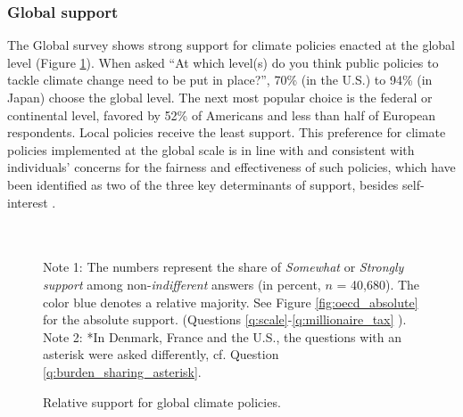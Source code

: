 \subsubsection{Global support}\label{subsubsec:global_support}

The Global survey shows strong support for climate policies enacted at the global level (Figure \ref{fig:oecd}). %
When asked ``At which level(s) do you think public policies to tackle climate change need to be put in place?'', 70\% (in the U.S.) to 94\% (in Japan) choose the global level. The next most popular choice is the federal or continental level, favored by 52\% of Americans and less than half of European respondents. Local policies receive the least support. This preference for climate policies implemented at the global scale is in line with \citet{beiser-mcgrath_could_2019} and consistent with individuals' concerns for the fairness and effectiveness of such policies, which have been identified as two of the three key determinants of support, besides self-interest \citep{klenert_making_2018,douenne_yellow_2022,dechezlepretre_fighting_2022}.
\begin{figure}[h!]
  \caption[Relative support for global climate policies]{Relative support for global climate policies.} 
  \label{fig:oecd} %
  {\footnotesize \\ $\quad$ \\ Note 1: The numbers represent the share of \textit{Somewhat} or \textit{Strongly support} among non-\textit{indifferent} answers (in percent, $n$ = 40,680). The color blue denotes a relative majority. See Figure \ref{fig:oecd_absolute} for the absolute support. (Questions \ref{q:scale}-\ref{q:millionaire_tax}%
). \\ Note 2: *In Denmark, France and the U.S., the questions with an asterisk were asked differently, cf. Question \ref{q:burden_sharing_asterisk}. } 
\end{figure}


